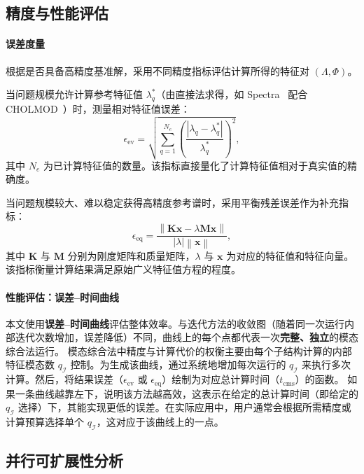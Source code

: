 \subsection{精度与性能评估}
\label{sec:evaluation}

\paragraph{误差度量}
根据是否具备高精度基准解，采用不同精度指标评估计算所得的特征对 $(\Lambda,\Phi)$。

当问题规模允许计算参考特征值 $\lambda_q^*$（由直接法求得，如 Spectra~\cite{Qiu2015Spectra} 配合 CHOLMOD~\cite{2008ChenCholmod}）时，测量相对特征值误差：
\begin{equation}
  \epsilon_{\text{ev}} = \sqrt{\sum_{q=1}^{N_e} \left( \frac{|\lambda_q - \lambda_q^*|}{\lambda_q^*} \right)^2},
  \label{eq:error-ev}
\end{equation}
其中 $N_e$ 为已计算特征值的数量。该指标直接量化了计算特征值相对于真实值的精确度。

当问题规模较大、难以稳定获得高精度参考谱时，采用平衡残差误差作为补充指标：
\begin{equation}
  \epsilon_{\text{eq}} = \frac{\left\| \mathbf{K} \mathbf{x} - \lambda \mathbf{M} \mathbf{x} \right\|}{ |\lambda| \left\| \mathbf{x} \right\|},
  \label{eq:error-eq}
\end{equation}
其中 $\mathbf{K}$ 与 $\mathbf{M}$ 分别为刚度矩阵和质量矩阵，$\lambda$ 与 $\mathbf{x}$ 为对应的特征值和特征向量。该指标衡量计算结果满足原始广义特征值方程的程度。

\paragraph{性能评估：误差--时间曲线}
本文使用\textbf{误差--时间曲线}评估整体效率。与迭代方法的收敛图（随着同一次运行内部迭代次数增加，误差降低）不同，曲线上的每个点都代表一次\textbf{完整、独立}的模态综合法运行。
模态综合法中精度与计算代价的权衡主要由每个子结构计算的内部特征模态数 $q_{\mathcal{I}}$ 控制。为生成该曲线，通过系统地增加每次运行的 $q_{\mathcal{I}}$ 来执行多次计算。然后，将结果误差（$\epsilon_{\text{ev}}$ 或 $\epsilon_{\text{eq}}$）绘制为对应总计算时间（$t_{\text{cms}}$）的函数。
如果一条曲线越靠左下，说明该方法越高效，这表示在给定的总计算时间（即给定的 $q_{\mathcal{I}}$ 选择）下，其能实现更低的误差。在实际应用中，用户通常会根据所需精度或计算预算选择单个 $q_{\mathcal{I}}$，这对应于该曲线上的一点。

\subsection{并行可扩展性分析}
\label{sec:scaling}


